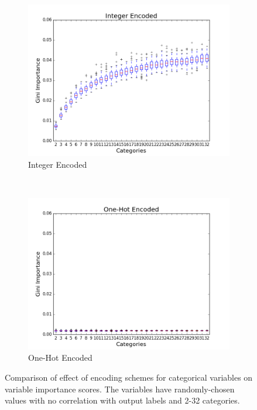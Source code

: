 \begin{figure}[h!]
  \centering
  \begin{subfigure}[b]{0.45\textwidth}
    \includegraphics[width=\textwidth]{figures/random_forests/rf_bias_integer}
    \caption{Integer Encoded}
    \label{fig:integer}
  \end{subfigure}
  ~
  \begin{subfigure}[b]{0.45\textwidth}
    \includegraphics[width=\textwidth]{figures/random_forests/rf_bias_onehot}
    \caption{One-Hot Encoded}
    \label{fig:one-hot}
  \end{subfigure}
  \caption{Comparison of effect of encoding schemes for categorical variables on variable importance scores. The variables have randomly-chosen values with no correlation with output labels and 2-32 categories.}
  \label{fig:encoding-schemes}
\end{figure}

